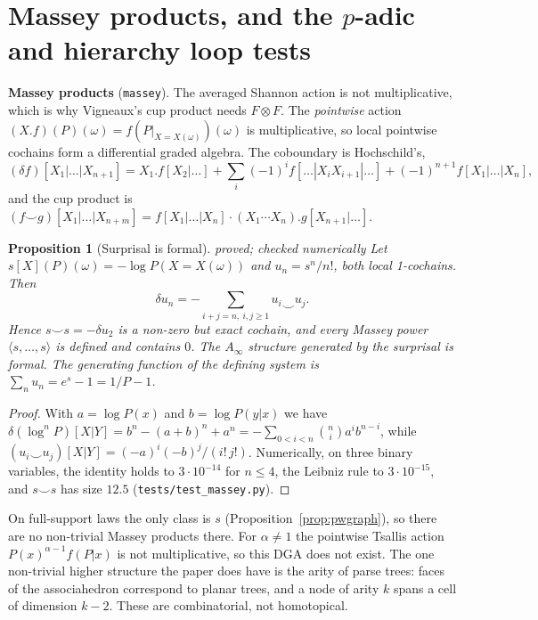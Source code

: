 \documentclass[11pt]{article}
\newtheorem{proposition}[theorem]{Proposition}
\theoremstyle{definition}
\theoremstyle{remark}
\newcommand{\st}[1]{\textsf{\small\color{gray}#1}}
\begin{document}
\section{Massey products, and the $p$-adic and hierarchy loop tests}\label{sec:massey}
\textbf{Massey products} (\texttt{massey}). The averaged Shannon action is not multiplicative, which is why Vigneaux's cup product needs $F\otimes F$. The \emph{pointwise} action $(X.f)(P)(\omega)=f(P|_{X=X(\omega)})(\omega)$ is multiplicative, so local pointwise cochains form a differential graded algebra. The coboundary is Hochschild's,
\[
(\delta f)[X_1|\dots|X_{n+1}]=X_1.f[X_2|\dots]+\textstyle\sum_i(-1)^if[\dots|X_iX_{i+1}|\dots]+(-1)^{n+1}f[X_1|\dots|X_n],
\]
and the cup product is $(f\smile g)[X_1|\dots|X_{n+m}]=f[X_1|\dots|X_n]\cdot(X_1\cdots X_n).g[X_{n+1}|\dots]$.
\begin{proposition}[Surprisal is formal]\label{prop:massey}\st{proved; checked numerically}
Let $s[X](P)(\omega)=-\log P(X=X(\omega))$ and $u_n=s^n/n!$, both local 1-cochains. Then
\[
\delta u_n=-\sum_{i+j=n,\ i,j\ge1}u_i\smile u_j .
\]
Hence $s\smile s=-\delta u_2$ is a non-zero but exact cochain, and every Massey power $\langle s,\dots,s\rangle$ is defined and contains $0$. The $A_\infty$ structure generated by the surprisal is formal. The generating function of the defining system is $\sum_n u_n=e^{s}-1=1/P-1$.
\end{proposition}
\begin{proof}
With $a=\log P(x)$ and $b=\log P(y|x)$ we have $\delta(\log^nP)[X|Y]=b^n-(a+b)^n+a^n=-\sum_{0<i<n}\binom ni a^ib^{n-i}$, while $(u_i\smile u_j)[X|Y]=(-a)^i(-b)^j/(i!\,j!)$. Numerically, on three binary variables, the identity holds to $3\cdot10^{-14}$ for $n\le4$, the Leibniz rule to $3\cdot10^{-15}$, and $s\smile s$ has size $12.5$ (\texttt{tests/test\_massey.py}).
\end{proof}
\noindent On full-support laws the only class is $s$ (Proposition~\ref{prop:pwgraph}), so there are no non-trivial Massey products there. For $\alpha\ne1$ the pointwise Tsallis action $P(x)^{\alpha-1}f(P|x)$ is not multiplicative, so this DGA does not exist. The one non-trivial higher structure the paper does have is the arity of parse trees: faces of the associahedron correspond to planar trees, and a node of arity $k$ spans a cell of dimension $k-2$. These are combinatorial, not homotopical.
\end{document}
